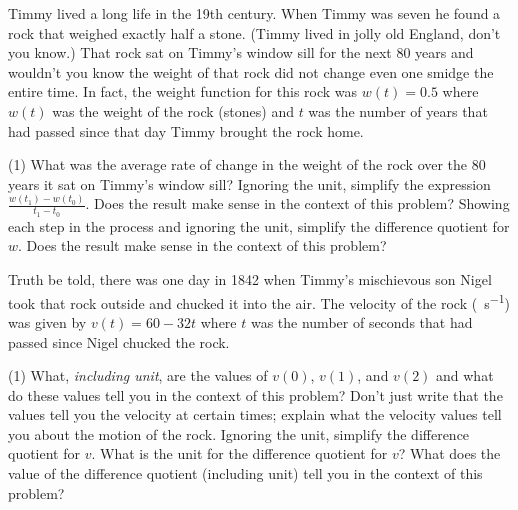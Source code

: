 \documentclass[10pt,oneside,]{book}
\theoremstyle{plain}
\theoremstyle{definition}
\numberwithin{equation}{section}
\newcommand{\fe}[2]{#1\mathopen{}\left(#2\right)\mathclose{}}
\begin{document}
\hypertarget{exercisegroup-6}{\null}Timmy lived a long life in the 19th century. When Timmy was seven he found a rock that weighed exactly half a stone. (Timmy lived in jolly old England, don't you know.) That rock sat on Timmy's window sill for the next 80 years and wouldn't you know the weight of that rock did not change even one smidge the entire time. In fact, the weight function for this rock was \(\fe{w}{t}=0.5\) where \(\fe{w}{t}\) was the weight of the rock (stones) and \(t\) was the number of years that had passed since that day Timmy brought the rock home.%
\par
\begin{exercisegroup}(1)
\exercise[12.]\hypertarget{exercise-20}{\null}What was the average rate of change in the weight of the rock over the 80 years it sat on Timmy's window sill?%
\exercise[13.]\hypertarget{exercise-21}{\null}Ignoring the unit, simplify the expression \(\frac{\fe{w}{t_1}-\fe{w}{t_0}}{t_1-t_0}\). Does the result make sense in the context of this problem?%
\exercise[14.]\hypertarget{exercise-22}{\null}Showing each step in the process and ignoring the unit, simplify the difference quotient for \(w\). Does the result make sense in the context of this problem?%
\end{exercisegroup}
\par\smallskip\noindent
\hypertarget{exercisegroup-7}{\null}Truth be told, there was one day in 1842 when Timmy's mischievous son Nigel took that rock outside and chucked it into the air. The velocity of the rock (\si{\foot\per\second}) was given by \(\fe{v}{t}=60-32t\) where \(t\) was the number of seconds that had passed since Nigel chucked the rock.%
\par
\begin{exercisegroup}(1)
\exercise[15.]\hypertarget{exercise-23}{\null}What, \emph{including unit}, are the values of \(\fe{v}{0}\), \(\fe{v}{1}\), and \(\fe{v}{2}\) and what do these values tell you in the context of this problem? Don't just write that the values tell you the velocity at certain times; explain what the velocity values tell you about the motion of the rock.%
\exercise[16.]\hypertarget{exercise-24}{\null}Ignoring the unit, simplify the difference quotient for \(v\).%
\exercise[17.]\hypertarget{exercise-25}{\null}What is the unit for the difference quotient for \(v\)? What does the value of the difference quotient (including unit) tell you in the context of this problem?%
\end{exercisegroup}
\par\smallskip\noindent
\end{document}
